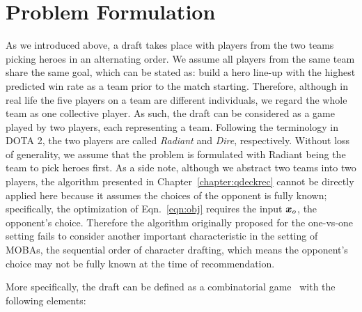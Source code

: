 \section{Problem Formulation}\label{sec:probdef}
As we introduced above, a draft takes place with players from the two teams picking heroes in an alternating order. We assume all players from the same team share the same goal, which can be stated as: build a hero line-up with the highest predicted win rate as a team prior to the match starting. Therefore, although in real life the five players on a team are different individuals, we regard the whole team as one collective player. As such, the draft can be considered as a game played by two players, each representing a team.  Following the terminology in DOTA 2, the two players are called \textit{Radiant} and \textit{Dire}, respectively. Without loss of generality, we assume that the problem is formulated with Radiant being the team to pick heroes first. As a side note, although we abstract two teams into two players, the algorithm presented in Chapter~\ref{chapter:qdeckrec} cannot be directly applied here because it assumes the choices of the opponent is fully known; specifically, the optimization of Eqn.~\ref{eqn:obj} requires the input $\boldsymbol{x}_o$, the opponent's choice. Therefore the algorithm originally proposed for the one-vs-one setting fails to consider another important characteristic in the setting of MOBAs, the sequential order of character drafting, which means the opponent's choice may not be fully known at the time of recommendation.

More specifically, the draft can be defined as a combinatorial game~\citep{browne2012survey} with the following elements:

